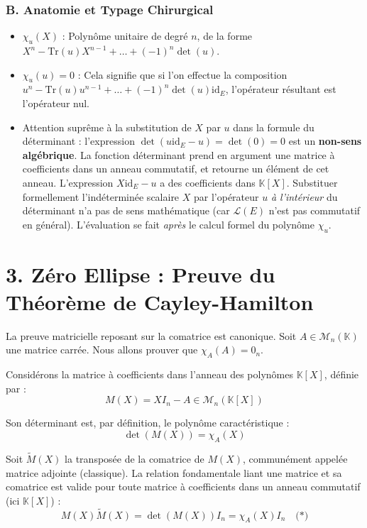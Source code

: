 \documentclass[11pt,a4paper]{article}
\begin{document}
\subsubsection{B. Anatomie et Typage Chirurgical}
\begin{itemize}
\item $\chi_u(X)$ : Polynôme unitaire de degré $n$, de la forme $X^n - \text{Tr}(u)X^{n-1} + \dots + (-1)^n \det(u)$.
\item $\chi_u(u) = 0$ : Cela signifie que si l'on effectue la composition $u^n - \text{Tr}(u)u^{n-1} + \dots + (-1)^n \det(u)\text{id}_E$, l'opérateur résultant est l'opérateur nul.
\item Attention suprême à la substitution de $X$ par $u$ dans la formule du déterminant : l'expression $\det(u \text{id}_E - u) = \det(0) = 0$ est un \textbf{non-sens algébrique}. La fonction déterminant prend en argument une matrice à coefficients dans un anneau commutatif, et retourne un élément de cet anneau. L'expression $X \text{id}_E - u$ a des coefficients dans $\mathbb{K}[X]$. Substituer formellement l'indéterminée scalaire $X$ par l'opérateur $u$ \textit{à l'intérieur} du déterminant n'a pas de sens mathématique (car $\mathcal{L}(E)$ n'est pas commutatif en général). L'évaluation se fait \textit{après} le calcul formel du polynôme $\chi_u$.
\end{itemize}

\section{3. Zéro Ellipse : Preuve du Théorème de Cayley-Hamilton}

La preuve matricielle reposant sur la comatrice est canonique. Soit $A \in \mathcal{M}_n(\mathbb{K})$ une matrice carrée. Nous allons prouver que $\chi_A(A) = 0_{n}$.

Considérons la matrice à coefficients dans l'anneau des polynômes $\mathbb{K}[X]$, définie par :
$$M(X) = X I_n - A \in \mathcal{M}_n(\mathbb{K}[X])$$

Son déterminant est, par définition, le polynôme caractéristique :
$$\det(M(X)) = \chi_A(X)$$

Soit $\widetilde{M}(X)$ la transposée de la comatrice de $M(X)$, communément appelée matrice adjointe (classique). La relation fondamentale liant une matrice et sa comatrice est valide pour toute matrice à coefficients dans un anneau commutatif (ici $\mathbb{K}[X]$) :
$$M(X) \widetilde{M}(X) = \det(M(X)) I_n = \chi_A(X) I_n \quad \text{(*)}$$
\end{document}
